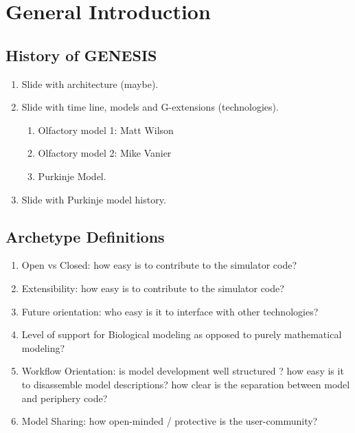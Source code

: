\documentclass[12pt]{article}
\begin{document}


\section{General Introduction}

\subsection{History of GENESIS}

\begin{enumerate}
\item Slide with architecture (maybe).
\item Slide with time line, models and G-extensions (technologies).
  \begin{enumerate}
  \item Olfactory model 1: Matt Wilson
  \item Olfactory model 2: Mike Vanier
  \item Purkinje Model.
  \end{enumerate}
\item Slide with Purkinje model history.
\end{enumerate}


\subsection{Archetype Definitions}

\begin{enumerate}
\item Open vs Closed: how easy is to contribute to the simulator code?
\item Extensibility: how easy is to contribute to the simulator code?
\item Future orientation: who easy is it to interface with other
  technologies?

\item Level of support for Biological modeling as opposed to purely
  mathematical modeling?
\item Workflow Orientation: is model development well structured ?
  how easy is it to disassemble model descriptions?  how clear is the
  separation between model and periphery code?
\item Model Sharing: how open-minded / protective is the
  user-community?
\end{enumerate}
\end{document}
